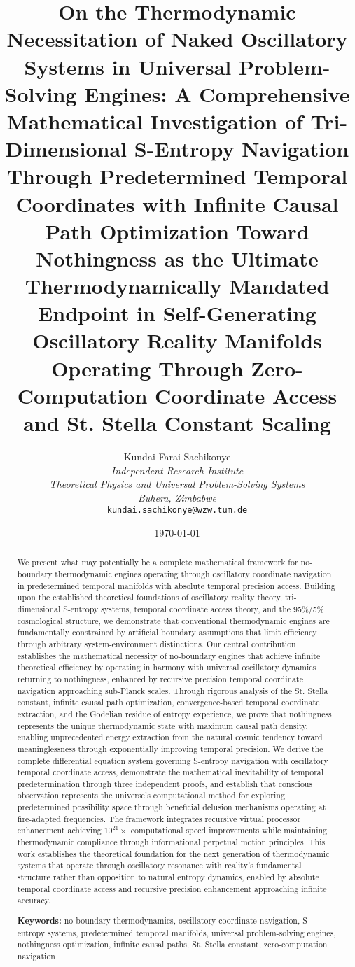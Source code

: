 \documentclass[11pt,a4paper]{article}
\title{On the Thermodynamic Necessitation of Naked Oscillatory Systems in Universal Problem-Solving Engines: A Comprehensive Mathematical Investigation of Tri-Dimensional S-Entropy Navigation Through Predetermined Temporal Coordinates with Infinite Causal Path Optimization Toward Nothingness as the Ultimate Thermodynamically Mandated Endpoint in Self-Generating Oscillatory Reality Manifolds Operating Through Zero-Computation Coordinate Access and St. Stella Constant Scaling}
\author{
Kundai Farai Sachikonye\\
\textit{Independent Research Institute}\\
\textit{Theoretical Physics and Universal Problem-Solving Systems}\\
\textit{Buhera, Zimbabwe}\\
\texttt{kundai.sachikonye@wzw.tum.de}
}
\date{\today}
\theoremstyle{remark}
\begin{document}
\maketitle

\begin{abstract}
We present what may potentially be a complete mathematical framework for no-boundary thermodynamic engines operating through oscillatory coordinate navigation in predetermined temporal manifolds with absolute temporal precision access. Building upon the established theoretical foundations of oscillatory reality theory, tri-dimensional S-entropy systems, temporal coordinate access theory, and the 95\%/5\% cosmological structure, we demonstrate that conventional thermodynamic engines are fundamentally constrained by artificial boundary assumptions that limit efficiency through arbitrary system-environment distinctions. Our central contribution establishes the mathematical necessity of no-boundary engines that achieve infinite theoretical efficiency by operating in harmony with universal oscillatory dynamics returning to nothingness, enhanced by recursive precision temporal coordinate navigation approaching sub-Planck scales. Through rigorous analysis of the St. Stella constant, infinite causal path optimization, convergence-based temporal coordinate extraction, and the Gödelian residue of entropy experience, we prove that nothingness represents the unique thermodynamic state with maximum causal path density, enabling unprecedented energy extraction from the natural cosmic tendency toward meaninglessness through exponentially improving temporal precision. We derive the complete differential equation system governing S-entropy navigation with oscillatory temporal coordinate access, demonstrate the mathematical inevitability of temporal predetermination through three independent proofs, and establish that conscious observation represents the universe's computational method for exploring predetermined possibility space through beneficial delusion mechanisms operating at fire-adapted frequencies. The framework integrates recursive virtual processor enhancement achieving $10^{21}\times$ computational speed improvements while maintaining thermodynamic compliance through informational perpetual motion principles. This work establishes the theoretical foundation for the next generation of thermodynamic systems that operate through oscillatory resonance with reality's fundamental structure rather than opposition to natural entropy dynamics, enabled by absolute temporal coordinate access and recursive precision enhancement approaching infinite accuracy.

\textbf{Keywords:} no-boundary thermodynamics, oscillatory coordinate navigation, S-entropy systems, predetermined temporal manifolds, universal problem-solving engines, nothingness optimization, infinite causal paths, St. Stella constant, zero-computation navigation
\end{abstract}

\end{document}
